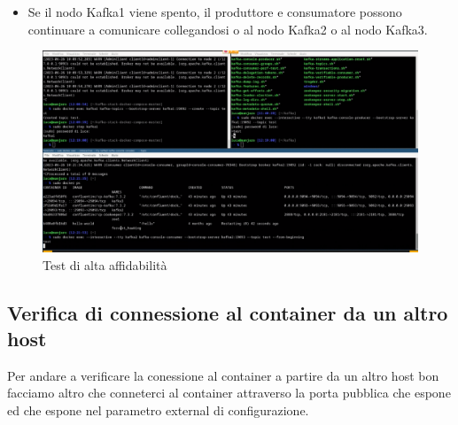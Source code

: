 \documentclass{article}
\begin{document}
\begin{itemize}
    \item Se il nodo Kafka1 viene spento, il produttore e consumatore possono continuare a comunicare collegandosi o al nodo Kafka2 o al nodo Kafka3.
\end{itemize}
\begin{figure}[H]
    \centering
    \includegraphics[scale=0.5]{images/test_di_high_avaibility.png}
    \caption{Test di alta affidabilità}
    \label{fig:my_label}
\end{figure}

\subsection{Verifica di connessione al container da un altro host}
Per andare a verificare la conessione al container a partire da un altro host bon facciamo altro che conneterci al container attraverso la porta pubblica che espone ed che espone nel parametro external di configurazione.
\end{document}
